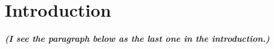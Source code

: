 
\section*{Introduction}

%
%

\textit{\textbf{(I see the paragraph below as the last one in the introduction.)}}

